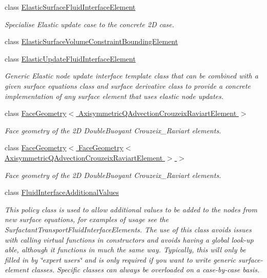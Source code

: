 \begin{DoxyCompactItemize}
class \hyperlink{classoomph_1_1ElasticSurfaceFluidInterfaceElement}{Elastic\+Surface\+Fluid\+Interface\+Element}
\begin{DoxyCompactList}\small\item\em Specialise Elastic update case to the concrete 2D case. \end{DoxyCompactList}\item 
class \hyperlink{classoomph_1_1ElasticSurfaceVolumeConstraintBoundingElement}{Elastic\+Surface\+Volume\+Constraint\+Bounding\+Element}
\item 
class \hyperlink{classoomph_1_1ElasticUpdateFluidInterfaceElement}{Elastic\+Update\+Fluid\+Interface\+Element}
\begin{DoxyCompactList}\small\item\em Generic Elastic node update interface template class that can be combined with a given surface equations class and surface derivative class to provide a concrete implementation of any surface element that uses elastic node updates. \end{DoxyCompactList}\item 
class \hyperlink{classoomph_1_1FaceGeometry_3_01AxisymmetricQAdvectionCrouzeixRaviartElement_01_4}{Face\+Geometry$<$ Axisymmetric\+Q\+Advection\+Crouzeix\+Raviart\+Element $>$}
\begin{DoxyCompactList}\small\item\em Face geometry of the 2D Double\+Buoyant Crouzeix\+\_\+\+Raviart elements. \end{DoxyCompactList}\item 
class \hyperlink{classoomph_1_1FaceGeometry_3_01FaceGeometry_3_01AxisymmetricQAdvectionCrouzeixRaviartElement_01_4_01_4}{Face\+Geometry$<$ Face\+Geometry$<$ Axisymmetric\+Q\+Advection\+Crouzeix\+Raviart\+Element $>$ $>$}
\begin{DoxyCompactList}\small\item\em Face geometry of the 2D Double\+Buoyant Crouzeix\+\_\+\+Raviart elements. \end{DoxyCompactList}\item 
class \hyperlink{classoomph_1_1FluidInterfaceAdditionalValues}{Fluid\+Interface\+Additional\+Values}
\begin{DoxyCompactList}\small\item\em This policy class is used to allow additional values to be added to the nodes from new surface equations, for examples of usage see the Surfactant\+Transport\+Fluid\+Interface\+Elements. The use of this class avoids issues with calling virtual functions in constructors and avoids having a global look-\/up able, although it functions in much the same way. Typically, this will only be filled in by \char`\"{}expert users\char`\"{} and is only required if you want to write generic surface-\/element classes. Specific classes can always be overloaded on a case-\/by-\/case basis. \end{DoxyCompactList}\item 

\end{DoxyCompactItemize}
